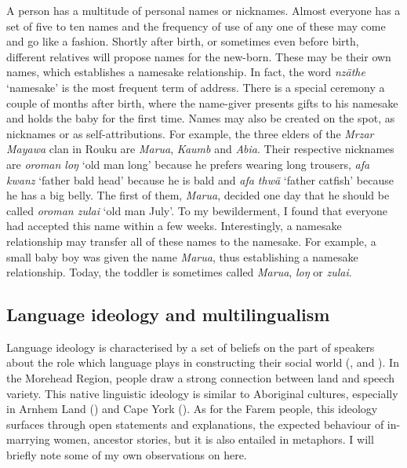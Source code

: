 A person has a multitude of personal names or nicknames. Almost everyone has a set of five to ten names and the frequency of use of any one of these may come and go like a fashion. Shortly after birth, or sometimes even before birth, different relatives will propose names for the new-born. These may be their own names, which establishes a namesake relationship. In fact, the word \emph{nzäthe} `namesake' is the most frequent term of address. There is a special ceremony a couple of months after birth, where the name-giver presents gifts to his namesake and holds the baby for the first time. Names may also be created on the spot, as nicknames or as self-attributions. For example, the three elders of the \emph{Mrzar Mayawa} clan in Rouku are \emph{Marua}, \emph{Kaumb} and \emph{Abia}. Their respective nicknames are \emph{oroman loŋ} `old man long' because he prefers wearing long trousers, \emph{afa kwanz} `father bald head' because he is bald and \emph{afa thwä} `father catfish' because he has a big belly. The first of them, \emph{Marua}, decided one day that he should be called \emph{oroman zulai} `old man July'. To my bewilderment, I found that everyone had accepted this name within a few weeks. Interestingly, a namesake relationship may transfer all of these names to the namesake. For example, a small baby boy was given the name \emph{Marua}, thus establishing a namesake relationship. Today, the toddler is sometimes called \emph{Marua}, \emph{loŋ} or \emph{zulai}.

\subsection{Language ideology and multilingualism}\label{ideomulti}

Language ideology is characterised by a set of beliefs on the part of speakers about the role which language plays in constructing their social world (\citealt{Silverstein:1979li}, \citealt{Rumsey:1990vb} and \citealt{Makihara:2007co}). In the Morehead Region, people draw a strong connection between land and speech variety. This native linguistic ideology is similar to Aboriginal cultures, especially in Arnhem Land (\citealt{Merlan:1981ue}) and Cape York (\citealt{Sutton1978:ws}). As for the Farem people, this ideology surfaces through open statements and explanations, the expected behaviour of in-marrying women, ancestor stories, but it is also entailed in metaphors. I will briefly note some of my own observations on  here.

